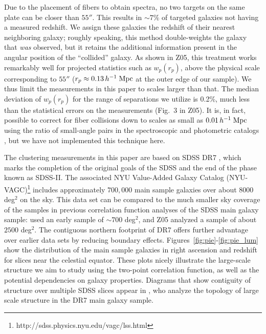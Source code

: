 \documentclass[]{emulateapj}
\newcommand{\hmpc}{\,h^{-1}\;{\rm Mpc}}
\newcommand{\wrp}{{w_p(r_p)}}
\begin{document}
Due to the placement of fibers to obtain spectra, no two targets on the
same plate can be closer than $55''$. This results in $\sim 7\%$ of targeted 
galaxies not having a measured redshift. We assign these galaxies  the 
redshift of their nearest neighboring galaxy; 
roughly speaking, this method double-weights the galaxy that {\it was}
observed, but it retains the additional information present in the
angular position of the ``collided'' galaxy.
As shown in Z05, this treatment works remarkably well
for projected statistics such as $\wrp$,  above the physical scale
corresponding to $55''$ ($r_p \approx 0.13\hmpc$ at the outer edge of
our sample). 
We thus limit the measurements in this paper to scales larger than that.
The median deviation of $\wrp$ for the range of separations we utilize
is 0.2\%, much less than the statistical errors on the measurements 
(Fig.~3 in Z05).
It is, in fact, possible to correct for fiber collisions down to 
scales as small as $0.01\hmpc$ using the ratio of small-angle pairs in the 
spectroscopic and photometric catalogs \citep{masjedi06,li06,li09},
but we have not implemented this technique here.

The clustering  measurements in this paper are based on SDSS 
DR7 \citep{abazajian09}, which marks the completion of the 
original goals of the SDSS and the end of the phase known as SDSS-II.
The associated NYU Value-Added Galaxy Catalog 
(NYU-VAGC)\footnote{http://sdss.physics.nyu.edu/vagc/lss.html} 
includes approximately
$700,000$ main sample galaxies over about 8000 deg$^2$ on the 
sky. This data set can be compared to the much smaller sky coverage of the 
samples
in previous correlation function analyses of the SDSS main galaxy sample:
\citet{zehavi02} used an early sample of $\sim 700$ deg$^2$, and Z05
analyzed a sample of about $2500$ deg$^2$.
The contiguous northern footprint of DR7 offers further advantage
over earlier data sets by reducing boundary effects.
%
Figures~\ref{fig:pie}-\ref{fig:pie_lum} show the distribution of the main 
sample galaxies in right ascension and redshift for slices
near the celestial equator. These plots nicely illustrate the large-scale 
structure we aim to study using the two-point correlation function,
as well as the potential dependencies on galaxy properties.  
Diagrams that show contiguity of structure over multiple SDSS
slices appear in \cite{choi10}, who analyze the topology of 
large scale structure in the DR7 main galaxy sample.

\begin{figure*}[tbp]%
\caption[]{\label{fig:pie}
The distribution of galaxies in the SDSS main galaxy sample.
Only galaxies within $\pm 1.25$ degrees of the Celestial Equator are shown.
}
\end{figure*}
\end{document}
